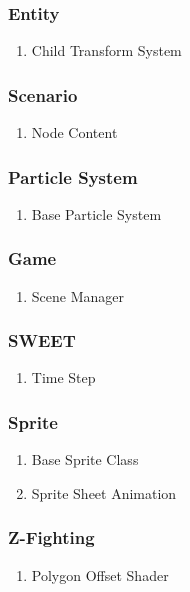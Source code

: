 \subsubsection{Entity}
\begin{enumerate}
\item Child Transform System
\end{enumerate}
\subsubsection{Scenario}
\begin{enumerate}
\item Node Content
\end{enumerate}
\subsubsection{Particle System}
\begin{enumerate}
\item Base Particle System
\end{enumerate}
\subsubsection{Game}
\begin{enumerate}
\item Scene Manager
\end{enumerate}
\subsubsection{SWEET}
\begin{enumerate}
\item Time Step
\end{enumerate}
\subsubsection{Sprite}
\begin{enumerate}
\item Base Sprite Class
\item Sprite Sheet Animation
\end{enumerate}
\subsubsection{Z-Fighting}
\begin{enumerate}
\item Polygon Offset Shader
\end{enumerate}
